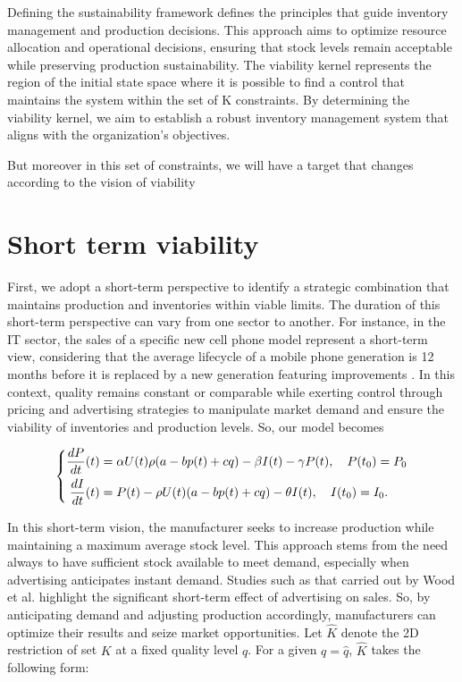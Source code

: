 \documentclass[]{interact}
\theoremstyle{plain}%
\theoremstyle{definition}
\theoremstyle{remark}
\begin{document}
Defining the sustainability framework defines the principles that guide inventory management and production decisions. This approach aims to optimize resource allocation and operational decisions, ensuring that stock levels remain acceptable while preserving production sustainability. The viability kernel represents the region of the initial state space where it is possible to find a control that maintains the system within the set of K constraints. By determining the viability kernel, we aim to establish a robust inventory management system that aligns with the organization's objectives.

But moreover in this set of constraints, we will have a target that changes according to the vision of viability 

\section{Short term viability}
First, we adopt a short-term perspective to identify a strategic combination that maintains production and inventories within viable limits. The duration of this short-term perspective can vary from one sector to another. For instance, in the IT sector, the sales of a specific new cell phone model represent a short-term view, considering that the average lifecycle of a mobile phone generation is 12 months before it is replaced by a new generation featuring improvements \cite{generation_iphone}. In this context, quality remains constant or comparable while exerting control through pricing and advertising strategies to manipulate market demand and ensure the viability of inventories and production levels. So, our model becomes


	\begin{equation}\label{equa2d}
	\centering
	\left\{\begin{split}
	\frac{dP}{dt}(t)    &  = \alpha U(t) \rho(a-b p(t)+c q) - \beta I(t)- \gamma P(t), \quad P(t_0) = P_0\\
		\frac{dI}{dt}(t)         &  = P(t) - \rho U(t) (a-b p(t)+c q) -\theta I(t), \quad  I(t_0) = I_{0}.		
	\end{split}\right.
\end{equation}

In this short-term vision, the manufacturer seeks to increase production while maintaining a maximum average stock level. This approach stems from the need always to have sufficient stock available to meet demand, especially when advertising anticipates instant demand. Studies such as that carried out by Wood et al. \cite{wood2009short} highlight the significant short-term effect of advertising on sales. So, by anticipating demand and adjusting production accordingly, manufacturers can optimize their results and seize market opportunities. Let \( \hat{K} \) denote the 2D restriction of set \( K \) at a fixed quality level \( q \). For a given \( q = \hat{q} \), \( \hat{K} \) takes the following form:
\end{document}
